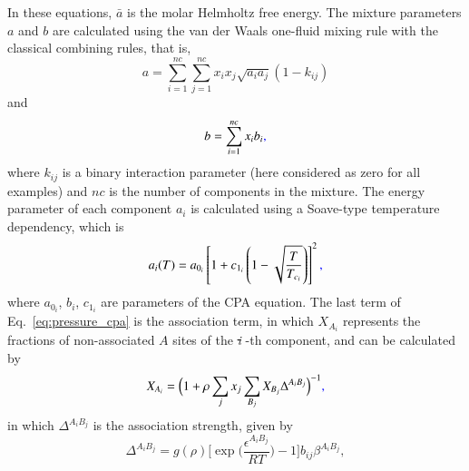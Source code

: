 \documentclass[preprint,12pt,3p]{elsarticle}
\providecommand{\DIFadd}[1]{{\protect\color{blue}\uwave{#1}}} %
\providecommand{\DIFdel}[1]{{\protect\color{red}\sout{#1}}}                      %
\providecommand{\DIFaddbegin}{} %
\providecommand{\DIFaddend}{} %
\providecommand{\DIFdelbegin}{} %
\providecommand{\DIFdelend}{} %
\begin{document}
	In these equations, $\bar{a}$ is the molar Helmholtz free energy. The mixture parameters $a$ and $b$ are calculated using the van der Waals one-fluid mixing rule with the classical combining rules, that is,
\begin{equation}
    a = \sum_{i=1}^{nc} \sum_{j=1}^{nc} x_{i}x_{j}\sqrt{a_{i}a_{j}}(1-k_{ij})
\end{equation}
and
\begin{equation}
    b = \sum_{i=1}^{nc}x_{i}b_{i}\DIFaddbegin \DIFadd{,
}\DIFaddend \end{equation}
	where $k_{ij}$ is a binary interaction parameter (here considered as zero for all examples) and $nc$ is the number of components in the mixture. The energy parameter of each component $a_{i}$ is calculated using a Soave-type temperature dependency, which is \DIFaddbegin {}
\DIFaddend \begin{equation}
a_{i}(T) = a_{0_{i}}\left[1+c_{1_{i}}\left(1-\sqrt{\frac{T}{T_{c_{i}}}}\right)\right]^2\DIFaddbegin \DIFadd{,
}\DIFaddend \end{equation}
	where $a_{0_{i}}$, $b_{i}$, $c_{1_{i}}$ are parameters of the CPA equation. The last term of Eq.~\ref{eq:pressure_cpa} \DIFaddbegin {} \DIFaddend is the association term, in which $X_{A_{i}}$ represents the fractions of non-associated $A$ sites of the \DIFdelbegin \textit{\DIFdel{i}}%
\DIFdelend \DIFaddbegin \DIFadd{$i$}\DIFaddend -th component, and can be calculated by
\begin{equation} \label{eq:frac_nb}
    X_{A_{i}} = \DIFdelbegin %
\DIFdelend \DIFaddbegin \Big(\DIFaddend 1+\rho \sum_{j}x_{j} \sum_{B_{j}} X_{B_{j}} \Delta^{A_{i}B_{j}}\DIFdelbegin %
\DIFdelend \DIFaddbegin \Big)\DIFaddend ^{-1}\DIFaddbegin \DIFadd{,
}\DIFaddend \end{equation}
    in which $\Delta^{A_{i}B_{j}}$ is the association strength, given by \DIFaddbegin {}
\DIFaddend \begin{equation} \label{eq:delta_cpa}
    \Delta^{A_{i}B_{j}} = g(\rho)\DIFdelbegin %
\DIFdelend \DIFaddbegin \Big[\DIFaddend \exp\DIFdelbegin %
\DIFdelend \DIFaddbegin \bigg(\DIFaddend \frac{\epsilon^{A_{i}B_{j}}}{RT}\DIFdelbegin %
\DIFdelend \DIFaddbegin \bigg)\DIFaddend -1\DIFdelbegin %
\DIFdelend \DIFaddbegin \Big]\DIFaddend b_{ij}\beta^{A_{i}B_{j}},
\end{equation}
\end{document}
